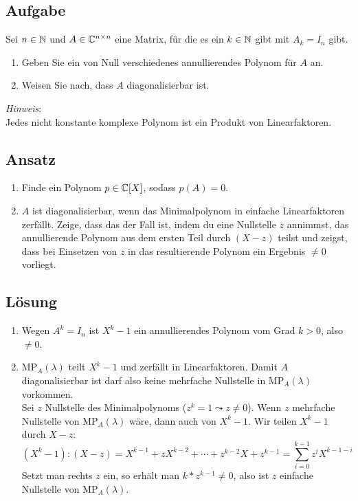 \subsection{Aufgabe}
Sei \( n \in \mathbb{N} \) und \( A \in \mathbb{C}^{n \times n} \) eine Matrix, für die es ein \( k \in \mathbb{N} \) gibt mit \( A_k = I_n \) gibt.
\begin{enumerate}
	\item Geben Sie ein von Null verschiedenes annullierendes Polynom für \( A \) an.
	\item Weisen Sie nach, dass \( A \) diagonalisierbar ist.
\end{enumerate}
\begin{remark}
	\emph{Hinweis}: \\
	Jedes nicht konstante komplexe Polynom ist ein Produkt von Linearfaktoren.
\end{remark}

\subsection{Ansatz}
\begin{enumerate}
	\item Finde ein Polynom \( p \in \mathbb{C}[X] \), sodass \( p(A) = 0 \).
	\item \( A \) ist diagonalisierbar, wenn das Minimalpolynom in einfache Linearfaktoren zerfällt. Zeige, dass das der Fall ist, indem du eine Nullstelle \( z \) annimmst, das annullierende Polynom aus dem ersten Teil durch \( (X-z) \) teilst und zeigst, dass bei Einsetzen von \( z \) in das resultierende Polynom ein Ergebnis \( \neq 0 \) vorliegt.
\end{enumerate}

\subsection{Lösung}
\begin{enumerate}
	\item Wegen \( A^k = I_n \) ist \( X^k-1 \) ein annullierendes Polynom vom Grad \( k > 0 \), also \( \neq 0 \).
	\item \( \text{MP}_A(\lambda) \) teilt \( X^k-1 \) und zerfällt in Linearfaktoren. Damit \( A \) diagonalisierbar ist darf also keine mehrfache Nullstelle in \( \text{MP}_A(\lambda) \) vorkommen.
		\\
		Sei \( z \) Nullstelle des Minimalpolynoms (\( z^k = 1 \leadsto z \neq 0 \)). Wenn \( z \) mehrfache Nullstelle von \( \text{MP}_A(\lambda) \) wäre, dann auch von \( X^k-1 \). Wir teilen \( X^k-1 \) durch \( X-z \): 
		\begin{equation*}
			(X^k-1):(X-z) = X^{k-1} + zX^{k-2} + \cdots + z^{k-2}X + z^{k-1} = \sum_{i = 0}^{k-1} z^iX^{k-1-i} 
		\end{equation*}
		Setzt man rechts \( z \) ein, so erhält man \( k*z^{k-1} \neq 0 \), also ist \( z \) einfache Nullstelle von \( \text{MP}_A(\lambda) \).
\end{enumerate}

